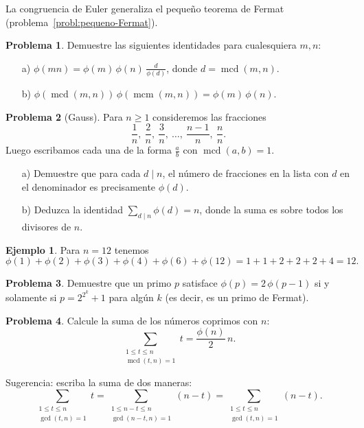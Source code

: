 \documentclass{article}
\DeclareMathOperator{\mcd}{mcd}
\DeclareMathOperator{\mcm}{mcm}
\theoremstyle{definition}
\newtheorem{problema}{Problema}[section]
\newtheorem*{ejemplo}{Ejemplo}
\begin{document}
La congruencia de Euler generaliza el pequeño teorema de Fermat
(problema~\ref{probl:pequeno-Fermat}).

\begin{problema}
  Demuestre las siguientes identidades para cualesquiera $m,n$:

  \begin{enumerate}
  \item[a)] $\phi (mn) = \phi (m)\,\phi (n) \, \frac{d}{\phi (d)}$,
    donde $d = \mcd (m,n)$.

  \item[b)] $\phi(\mcd (m,n)) \, \phi(\mcm (m,n)) = \phi(m)\,\phi(n)$.
  \end{enumerate}
\end{problema}

\begin{problema}[Gauss]
  Para $n \ge 1$ consideremos las fracciones
  \[
    \frac{1}{n}, ~
    \frac{2}{n}, ~
    \frac{3}{n}, ~
    \ldots, ~
    \frac{n-1}{n}, ~
    \frac{n}{n}.
  \]
  Luego escribamos cada una de la forma $\frac{a}{b}$ con $\mcd(a,b) = 1$.

  \begin{enumerate}
  \item[a)] Demuestre que para cada $d \mid n$, el número de fracciones en la
    lista con $d$ en el denominador es precisamente $\phi (d)$.

  \item[b)] Deduzca la identidad $\sum_{d\mid n} \phi (d) = n$, donde la suma es
    sobre todos los divisores de $n$.
  \end{enumerate}
\end{problema}

\begin{ejemplo}
  Para $n = 12$ tenemos
  \[ \phi (1) + \phi (2) + \phi (3) + \phi (4) + \phi (6) + \phi (12) =
    1 + 1 + 2 + 2 + 2 + 4 = 12. \]
\end{ejemplo}

\begin{problema}
  Demuestre que un primo $p$ satisface $\phi (p) = 2\,\phi (p-1)$ si y solamente
  si $p = 2^{2^k} + 1$ para algún $k$ (es decir, es un primo de Fermat).
\end{problema}

\begin{problema}
  Calcule la suma de los números coprimos con $n$:
  $$\sum_{\substack{1 \le t \le n \\ \mcd (t,n) = 1}} t = \frac{\phi(n)}{2}\,n.$$

  Sugerencia: escriba la suma de dos maneras:
  \[
    \sum_{\substack{1 \le t \le n \\ \gcd (t,n) = 1}} t =
    \sum_{\substack{1 \le n-t \le n \\ \gcd (n-t,n) = 1}} (n-t) =
    \sum_{\substack{1 \le t \le n \\ \gcd (t,n) = 1}} (n-t).
  \]
\end{problema}
\end{document}
